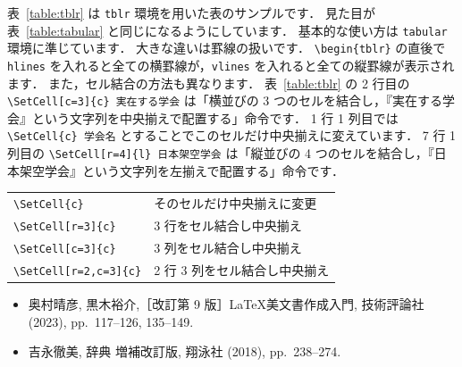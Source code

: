 表~\ref{table:tblr} は \verb|tblr| 環境を用いた表のサンプルです．
見た目が表~\ref{table:tabular} と同じになるようにしています．
基本的な使い方は \verb|tabular| 環境に準じています．
大きな違いは罫線の扱いです．
\verb|\begin{tblr}| の直後で \verb|hlines| を入れると全ての横罫線が，\verb|vlines| を入れると全ての縦罫線が表示されます．
また，セル結合の方法も異なります．
表~\ref{table:tblr} の 2 行目の \verb|\SetCell[c=3]{c} 実在する学会| は「横並びの 3 つのセルを結合し，『実在する学会』という文字列を中央揃えで配置する」命令です．
1 行 1 列目では \verb|\SetCell{c} 学会名| とすることでこのセルだけ中央揃えに変えています．
7 行 1 列目の \verb|\SetCell[r=4]{l} 日本架空学会| は「縦並びの 4 つのセルを結合し，『日本架空学会』という文字列を左揃えで配置する」命令です．

\begin{tcolorbox}[title={\texttt{tblr} 環境でセル結合する際に使用するコマンド}]
    \begin{tabular}{ll}
        \verb|\SetCell{c}|   & そのセルだけ中央揃えに変更 \\
        \verb|\SetCell[r=3]{c}|  & 3 行をセル結合し中央揃え \\
        \verb|\SetCell[c=3]{c}|  & 3 列をセル結合し中央揃え \\
        \verb|\SetCell[r=2,c=3]{c}|  & 2 行 3 列をセル結合し中央揃え \\
    \end{tabular}
\end{tcolorbox}

\begin{tcolorbox}[title={第~\ref{ch:figure_table}~章の参考文献}, colback=yellow!5!white, colframe=yellow!75!black, coltitle=black]
    \begin{itemize}
        \item 奥村晴彦, 黒木裕介,［改訂第 9 版］\LaTeX 美文書作成入門, 技術評論社 (2023), pp.~117--126, 135--149.
        \item 吉永徹美, \LaTeXe 辞典 増補改訂版, 翔泳社 (2018), pp.~238--274.
    \end{itemize}
\end{tcolorbox}


